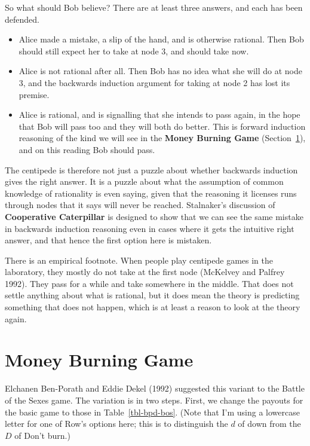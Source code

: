 \documentclass[
  11pt,
  letterpaper,
]{scrbook}
\providecommand{\tightlist}{%
  \setlength{\itemsep}{0pt}\setlength{\parskip}{0pt}}
\begin{document}
So what should Bob believe? There are at least three answers, and each
has been defended.

\begin{itemize}
\tightlist
\item
  Alice made a mistake, a slip of the hand, and is otherwise rational.
  Then Bob should still expect her to take at node 3, and should take
  now.
\item
  Alice is not rational after all. Then Bob has no idea what she will do
  at node 3, and the backwards induction argument for taking at node 2
  has lost its premise.
\item
  Alice is rational, and is signalling that she intends to pass again,
  in the hope that Bob will pass too and they will both do better. This
  is forward induction reasoning of the kind we will see in the
  \textbf{Money Burning Game} (Section~\ref{sec-money-burning}), and on
  this reading Bob should pass.
\end{itemize}

The centipede is therefore not just a puzzle about whether backwards
induction gives the right answer. It is a puzzle about what the
assumption of common knowledge of rationality is even saying, given that
the reasoning it licenses runs through nodes that it says will never be
reached. Stalnaker's discussion of \textbf{Cooperative Caterpillar} is
designed to show that we can see the same mistake in backwards induction
reasoning even in cases where it gets the intuitive right answer, and
that hence the first option here is mistaken.

There is an empirical footnote. When people play centipede games in the
laboratory, they mostly do not take at the first node (McKelvey and
Palfrey 1992). They pass for a while and take somewhere in the middle.
That does not settle anything about what is rational, but it does mean
the theory is predicting something that does not happen, which is at
least a reason to look at the theory again.

\section{Money Burning Game}\label{sec-money-burning}

Elchanen Ben-Porath and Eddie Dekel (1992) suggested this variant to the
Battle of the Sexes game. The variation is in two steps. First, we
change the payouts for the basic game to those in
Table~\ref{tbl-bpd-bos}. (Note that I'm using a lowercase letter for one
of Row's options here; this is to distinguish the \(d\) of down from the
\(D\) of Don't burn.)
\end{document}

